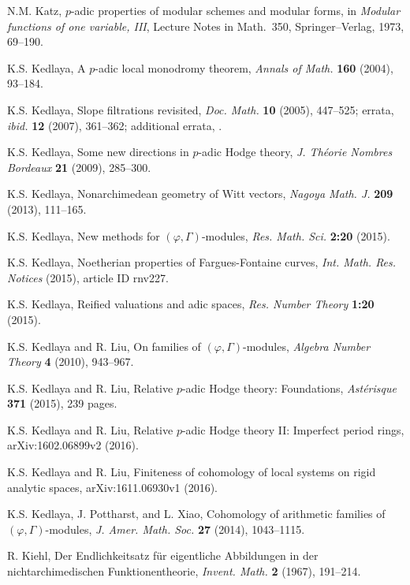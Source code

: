 \documentclass[12pt]{amsart}
\theoremstyle{definition}
\numberwithin{equation}{theorem}
\begin{document}
\begin{thebibliography}{99}
N.M. Katz, $p$-adic properties of modular schemes and modular forms,
in \textit{Modular functions of one variable, III}, Lecture Notes in Math.\ 350,
Springer--Verlag, 1973, 69--190. 

K.S. Kedlaya, A $p$-adic local monodromy theorem, 
\textit{Annals of Math.} \textbf{160} (2004), 93--184.

K.S. Kedlaya, Slope filtrations revisited,
\textit{Doc. Math.} \textbf{10} (2005), 447--525;
errata, \textit{ibid.} \textbf{12} (2007), 361--362;
additional errata, \cite[Remark~4.2.19]{kedlaya-liu1}.

K.S. Kedlaya, Some new directions in $p$-adic Hodge theory, \textit{J. Th\'eorie Nombres Bordeaux} \textbf{21} (2009), 285--300.

K.S. Kedlaya, Nonarchimedean geometry of Witt vectors,
\textit{Nagoya Math. J.} \textbf{209} (2013), 111--165.

K.S. Kedlaya, New methods for $(\varphi, \Gamma)$-modules,
\textit{Res. Math. Sci.} \textbf{2:20} (2015).

K.S. Kedlaya, Noetherian properties of Fargues-Fontaine curves,
\textit{Int. Math. Res. Notices} (2015), article ID rnv227. 

K.S. Kedlaya, Reified valuations and adic spaces, \textit{Res. Number Theory}
\textbf{1:20} (2015).

K.S. Kedlaya and R. Liu, On families of $(\varphi, \Gamma)$-modules,
\textit{Algebra Number Theory} \textbf{4} (2010), 943--967.

K.S. Kedlaya and R. Liu, Relative $p$-adic Hodge theory: Foundations,
\textit{Ast\'erisque} \textbf{371} (2015), 239 pages. 

K.S. Kedlaya and R. Liu, Relative $p$-adic Hodge theory II: Imperfect period rings,
arXiv:1602.06899v2 (2016).

K.S. Kedlaya and R. Liu, Finiteness of cohomology of local systems on rigid analytic spaces,
arXiv:1611.06930v1 (2016).

K.S. Kedlaya, J. Pottharst, and L. Xiao, Cohomology of arithmetic families of $(\varphi, \Gamma)$-modules, \textit{J. Amer. Math. Soc.}  \textbf{27} (2014), 1043--1115. 

R. Kiehl, Der Endlichkeitsatz f\"ur eigentliche Abbildungen
in der nichtarchimedischen Funktionentheorie,
\textit{Invent. Math.} \textbf{2} (1967), 191--214.


\end{thebibliography}
\end{document}

